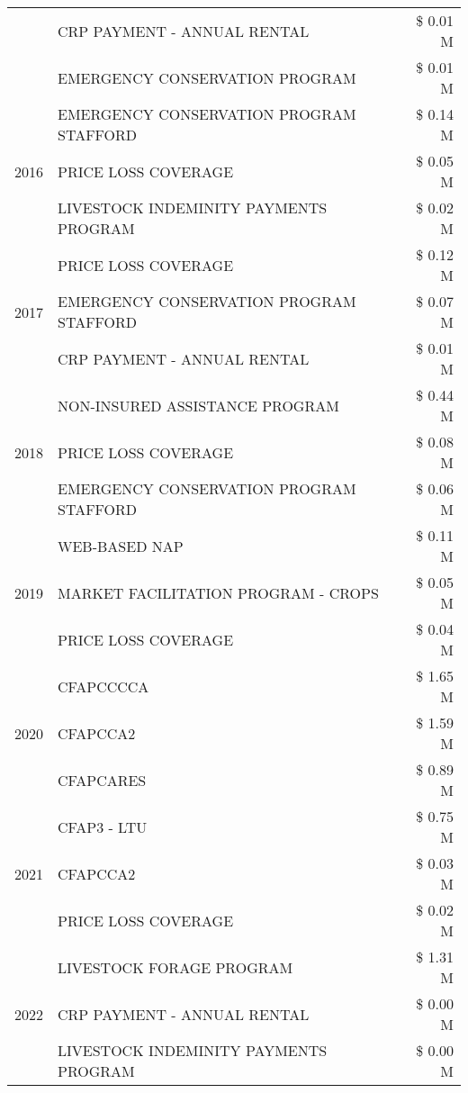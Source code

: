 \begin{tabular}{llr}
 & CRP PAYMENT - ANNUAL RENTAL & \$ 0.01 M \\
 & EMERGENCY CONSERVATION PROGRAM & \$ 0.01 M \\
\cline{1-3}
\multirow[t]{3}{*}{2016} & EMERGENCY CONSERVATION PROGRAM STAFFORD & \$ 0.14 M \\
 & PRICE LOSS COVERAGE & \$ 0.05 M \\
 & LIVESTOCK INDEMINITY PAYMENTS PROGRAM & \$ 0.02 M \\
\cline{1-3}
\multirow[t]{3}{*}{2017} & PRICE LOSS COVERAGE & \$ 0.12 M \\
 & EMERGENCY CONSERVATION PROGRAM STAFFORD & \$ 0.07 M \\
 & CRP PAYMENT - ANNUAL RENTAL & \$ 0.01 M \\
\cline{1-3}
\multirow[t]{3}{*}{2018} & NON-INSURED ASSISTANCE PROGRAM & \$ 0.44 M \\
 & PRICE LOSS COVERAGE & \$ 0.08 M \\
 & EMERGENCY CONSERVATION PROGRAM STAFFORD & \$ 0.06 M \\
\cline{1-3}
\multirow[t]{3}{*}{2019} & WEB-BASED NAP & \$ 0.11 M \\
 & MARKET FACILITATION PROGRAM - CROPS & \$ 0.05 M \\
 & PRICE LOSS COVERAGE & \$ 0.04 M \\
\cline{1-3}
\multirow[t]{3}{*}{2020} & CFAPCCCCA & \$ 1.65 M \\
 & CFAPCCA2 & \$ 1.59 M \\
 & CFAPCARES & \$ 0.89 M \\
\cline{1-3}
\multirow[t]{3}{*}{2021} & CFAP3 - LTU & \$ 0.75 M \\
 & CFAPCCA2 & \$ 0.03 M \\
 & PRICE LOSS COVERAGE & \$ 0.02 M \\
\cline{1-3}
\multirow[t]{3}{*}{2022} & LIVESTOCK FORAGE PROGRAM & \$ 1.31 M \\
 & CRP PAYMENT - ANNUAL RENTAL & \$ 0.00 M \\
 & LIVESTOCK INDEMINITY PAYMENTS PROGRAM & \$ 0.00 M \\
\cline{1-3}
\bottomrule
\end{tabular}
